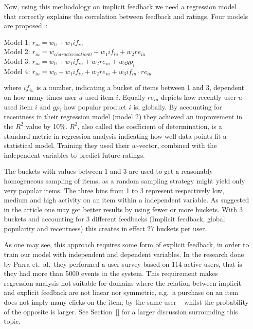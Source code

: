 Now, using this methodology on implicit feedback we need a regression model that
correctly explains the correlation between feedback and ratings. Four models
are proposed~\cite{parra2011walk}:

\noindent
Model 1: $r_{iu} = w_0 + w_1 if_{iu}$ \\
Model 2: $r_{iu} = w_{characterisation0} + w_1 if_{iu} + w_2 re_{iu}$ \\
Model 3: $r_{iu} = w_0 + w_1 if_{iu} + w_2 re_{iu} + w_3 gp_{i}$ \\
Model 4: $r_{iu} = w_0 + w_1 if_{iu} + w_2 re_{iu} + w_3 if_{iu} \cdot re_{iu}$

where $if_{iu}$ is a number, indicating a bucket of items between 1 and 3,
dependent on how many times user $u$ used item $i$. Equally $re_{iu}$ depicts
how recently user $u$ used item $i$ and $gp_{i}$ how popular product $i$ is,
globally. By accounting for recentness in their regression model (model 2)
they achieved an improvement in the $R^2$ value by 10\%. $R^2$, also called the
coefficient of determination, is a standard metric in regression analysis
indicating how well data points fit a statistical model. Training they used
their $w$-vector, combined with the independent variables to predict future
ratings.

The buckets with values between 1 and 3 are used to get a reasonably
homogeneous sampling of items, as a random sampling strategy might yield only
very popular items. The three bins from 1 to 3 represent respectively low,
medium and high activity on an item within a independent variable. As suggested
in the article one may get better results by using fewer or more buckets. With
3 buckets and accounting for 3 different feedbacks (Implicit feedback, global
popularity and recentness) this creates in effect 27 buckets per user.

As one may see, this approach requires some form of explicit feedback, in order
to train our model with independent and dependent variables. In the research
done by Parra et.\ al.\ they performed a user survey based on 114 active users,
that is they had more than 5000 events in the system. This requirement makes
regression analysis not suitable for domains where the relation between
implicit and explicit feedback are not linear nor symmetric, e.g.\ a purchase on
an item does not imply many clicks on the item, by the same user – whilst the
probability of the opposite is larger. See Section~\ref{} for a larger
discussion surrounding this topic. 

